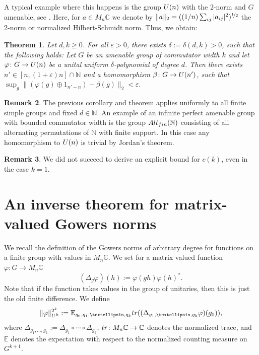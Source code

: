 \documentclass[a4paper,11pt]{amsproc}
\theoremstyle{plain}
\newtheorem{theorem}{Theorem}[section]
\theoremstyle{definition}
\newtheorem{remark}[theorem]{Remark}
\begin{document}
A typical example where this happens is the group ${\rm U}(n)$ with the 2-norm and $G$ amenable, see \cite{MR3867328}. Here, for $a \in  M_n \mathbb C$ we denote by $\|a\|_2 = ((1/n)\sum_{ij} |a_{ij}|^2)^{\nicefrac12}$ the 2-norm or normalized Hilbert-Schmidt norm. Thus, we obtain:

\begin{theorem}
Let $d,k \geq 0$. For all $\varepsilon>0$, there exists $\delta:=\delta(d,k)>0$, such that the following holds: Let $G$ be an amenable group of commutator width $k$ and let $\varphi \colon G \to {\rm U}(n)$ be a unital uniform $\delta$-polynomial of degree $d$. Then there exists $n' \in [n,(1+\varepsilon)n] \cap \mathbb N$ and a homomorphism $\beta \colon G \to {\rm U}(n')$, such that
$\sup_g \|(\varphi(g) \oplus 1_{n'-n}) - \beta(g)\|_2 < \varepsilon.$
\end{theorem}

\begin{remark}
The previous corollary and theorem applies uniformly to all finite simple groups and fixed $d \in \mathbb N.$ An example of an infinite perfect amenable group with bounded commutator width is the group ${\rm Alt}_{\rm fin}(\mathbb N)$ consisting of all alternating permutations of $\mathbb N$ with finite support. In this case any homomorphism to ${\rm U}(n)$ is trivial by Jordan's theorem.
\end{remark}



\begin{remark}
We did not succeed to derive an explicit bound for $c(k)$, even in the case $k=1$. 
\end{remark}

\section{An inverse theorem for matrix-valued Gowers norms}
\label{sec:gowers}

We recall the definition of the Gowers norms of arbitrary degree for functions on a finite group with values in $M_n \mathbb C$.  
We set for a matrix valued function $\varphi \colon G \to M_n \mathbb C$
$$(\Delta_g \varphi)(h) := \varphi(gh)\varphi(h)^*.$$
Note that if the function takes values in the group of unitaries, then this is just the old finite difference.
We define 
$$\|\varphi\|^{2^k}_{U^k} :=\mathbb E_{g_0,g_1,\dots,g_{k}} {\rm tr}((\Delta_{g_1,\dots,g_k}\varphi)(g_{0})),$$
where $\Delta_{g_1,\dots,g_k} := \Delta_{g_1} \circ \cdots \circ \Delta_{g_k}$, ${\rm tr} \colon M_n \mathbb C \to \mathbb C$ denotes the normalized trace, and $\mathbb E$ denotes the expectation with respect to the normalized counting measure on $G^{k+1}$. 
\end{document}
